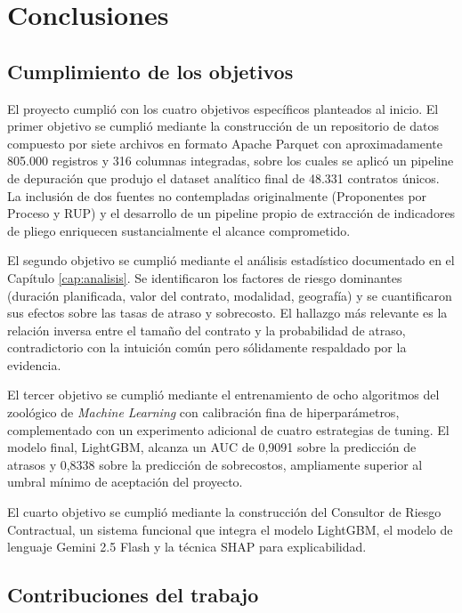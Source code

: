 \documentclass[12pt,letterpaper,oneside]{report}
\begin{document}
\chapter{Conclusiones}

\section{Cumplimiento de los objetivos}

El proyecto cumplió con los cuatro objetivos específicos planteados al
inicio. El primer objetivo se cumplió mediante la construcción de un
repositorio de datos compuesto por siete archivos en formato Apache Parquet
con aproximadamente 805.000 registros y 316 columnas integradas, sobre los
cuales se aplicó un pipeline de depuración que produjo el dataset analítico
final de 48.331 contratos únicos. La inclusión de dos fuentes no contempladas
originalmente (Proponentes por Proceso y RUP) y el desarrollo de un pipeline
propio de extracción de indicadores de pliego enriquecen sustancialmente el
alcance comprometido.

El segundo objetivo se cumplió mediante el análisis estadístico documentado
en el Capítulo \ref{cap:analisis}. Se identificaron los factores de riesgo
dominantes (duración planificada, valor del contrato, modalidad, geografía)
y se cuantificaron sus efectos sobre las tasas de atraso y sobrecosto. El
hallazgo más relevante es la relación inversa entre el tamaño del contrato y
la probabilidad de atraso, contradictorio con la intuición común pero
sólidamente respaldado por la evidencia.

El tercer objetivo se cumplió mediante el entrenamiento de ocho algoritmos
del zoológico de \emph{Machine Learning} con calibración fina de
hiperparámetros, complementado con un experimento adicional de cuatro
estrategias de tuning. El modelo final, LightGBM, alcanza un AUC de 0,9091
sobre la predicción de atrasos y 0,8338 sobre la predicción de sobrecostos,
ampliamente superior al umbral mínimo de aceptación del proyecto.

El cuarto objetivo se cumplió mediante la construcción del Consultor de
Riesgo Contractual, un sistema funcional que integra el modelo LightGBM, el
modelo de lenguaje Gemini 2.5 Flash y la técnica SHAP para explicabilidad.

\section{Contribuciones del trabajo}
\end{document}
